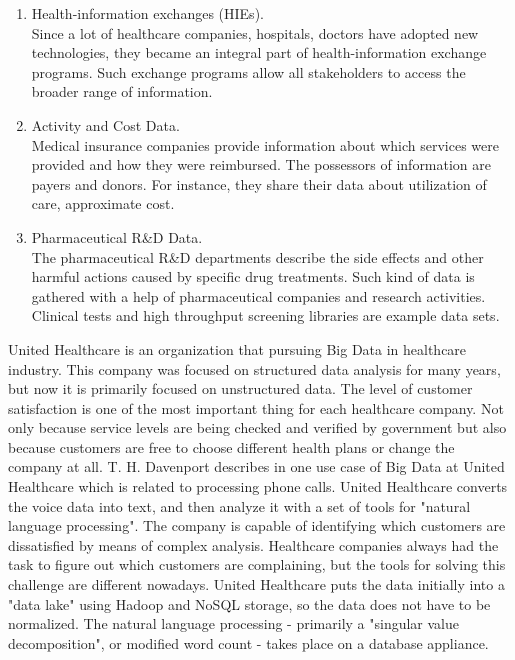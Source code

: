 \documentclass[runningheads]{llncs}
\begin{document}
\begin{enumerate}

\item Health-information exchanges (HIEs).\\

Since a lot of healthcare companies, hospitals, doctors have adopted new technologies, they became an integral part of health-information exchange programs. Such exchange programs allow all stakeholders to access the broader range of information.\\

\item Activity and Cost Data.\\

Medical insurance companies provide information about which services were provided and how they were reimbursed. The possessors of information are payers and donors. For instance, they share their data about utilization of care, approximate cost.\\

\item Pharmaceutical R\&D Data.\\

The pharmaceutical R\&D departments describe the side effects and other harmful actions caused by specific drug treatments. Such kind of data is gathered with a help of pharmaceutical companies and research activities. Clinical tests and high throughput screening libraries are example data sets.\\
\end{enumerate}

United Healthcare is an organization that pursuing Big Data in healthcare industry. This company was focused on structured data analysis for many years, but now it is primarily focused on unstructured data. The level of customer satisfaction is one of the most important thing for each healthcare company. Not only because service levels are being checked and verified by government but also because customers are free to choose different health plans or change the company at all. T. H. Davenport describes in \cite{DAVENPORT} one use case of Big Data at United Healthcare which is related to processing phone calls. United Healthcare converts the voice data into text, and then analyze it with a set of tools for "natural language processing". The company is capable of identifying which customers are dissatisfied by means of complex analysis. Healthcare companies always had the task to figure out which customers are complaining, but the tools for solving this challenge are different nowadays. United Healthcare puts the data initially into a "data lake" using Hadoop and NoSQL storage, so the data does not have to be normalized. The natural language processing - primarily a "singular value decomposition", or modified word count - takes place on a database appliance. 
\end{document}
